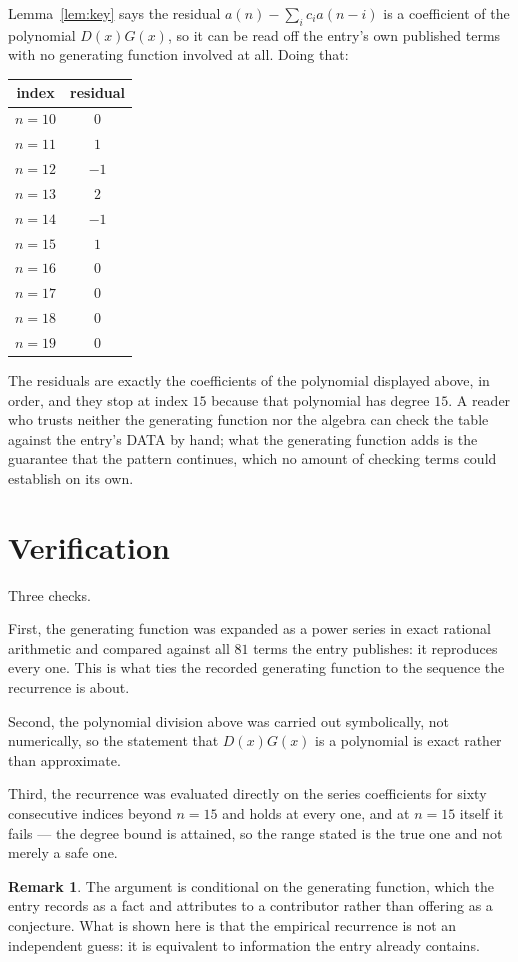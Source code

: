 \documentclass[11pt,a4paper]{article}
\theoremstyle{plain}
\theoremstyle{definition}
\newtheorem{remark}[theorem]{Remark}
\begin{document}
Lemma~\ref{lem:key} says the residual $a(n)-\sum_ic_ia(n-i)$ is a coefficient of the
polynomial $D(x)G(x)$, so it can be read off the entry's own published terms with no
generating function involved at all. Doing that:
\begin{center}
\begin{tabular}{cc}
index & residual \\ \hline
$n=10$ & $0$ \\
$n=11$ & $1$ \\
$n=12$ & $-1$ \\
$n=13$ & $2$ \\
$n=14$ & $-1$ \\
$n=15$ & $1$ \\
$n=16$ & $0$ \\
$n=17$ & $0$ \\
$n=18$ & $0$ \\
$n=19$ & $0$
\end{tabular}
\end{center}
The residuals are exactly the coefficients of the polynomial displayed above, in order, and
they stop at index $15$ because that polynomial has degree $15$. A reader who trusts
neither the generating function nor the algebra can check the table against the entry's DATA
by hand; what the generating function adds is the guarantee that the pattern continues, which
no amount of checking terms could establish on its own.

\section{Verification}

Three checks.

First, the generating function was expanded as a power series in exact rational arithmetic and
compared against all $81$ terms the entry publishes: it reproduces every one. This is
what ties the recorded generating function to the sequence the recurrence is about.

Second, the polynomial division above was carried out symbolically, not numerically, so the
statement that $D(x)G(x)$ is a polynomial is exact rather than approximate.

Third, the recurrence was evaluated directly on the series coefficients for sixty consecutive
indices beyond $n=15$ and holds at every one, and at $n=15$ itself it fails --- the
degree bound is attained, so the range stated is the true one and not merely a safe one.

\begin{remark}
The argument is conditional on the generating function, which the entry records as a fact and
attributes to a contributor rather than offering as a conjecture. What is shown here is that
the empirical recurrence is not an independent guess: it is equivalent to information the
entry already contains.
\end{remark}
\end{document}
